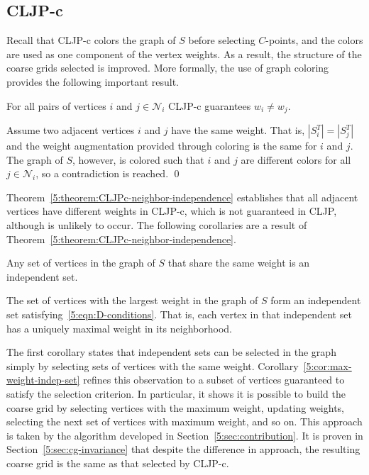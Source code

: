 \documentclass{elsart}
\newenvironment{proof}{\begin{pf}}{\qed\end{pf}}
\begin{document}
\subsection{CLJP-c}
Recall that CLJP-c colors the graph of $S$ before selecting
$C$-points, and the colors are used as one component of the vertex
weights. As a result, the structure of the coarse grids selected is
improved. More formally, the use of graph coloring provides the
following important result.
\begin{thm}
\label{5:theorem:CLJPc-neighbor-independence}
For all pairs of vertices $i$ and $j \in \mathcal{N}_i$ CLJP-c
guarantees $w_i \ne w_j$.
\end{thm}
\begin{proof}
Assume two adjacent vertices $i$ and $j$ have the same weight. That is,
$|S_i^T| = |S_j^T|$ and the weight augmentation provided through
coloring is the same for $i$ and $j$. The graph of $S$, however, is
colored such that $i$ and $j$ are different colors for all $j \in
\mathcal{N}_i$, so a contradiction is reached.
\end{proof}
Theorem~\ref{5:theorem:CLJPc-neighbor-independence} establishes that
all adjacent vertices have different weights in CLJP-c, which is not
guaranteed in CLJP, although is unlikely to occur. The following
corollaries are a result of
Theorem~\ref{5:theorem:CLJPc-neighbor-independence}.
\begin{cor}
Any set of vertices in the graph of $S$ that share the same weight is
an independent set.
\end{cor}
\begin{cor}
\label{5:cor:max-weight-indep-set}
The set of vertices with the largest weight in the graph of $S$ form
an independent set satisfying~\ref{5:eqn:D-conditions}. That is, each
vertex in that independent set has a uniquely maximal weight in its
neighborhood.
\end{cor}
The first corollary states that independent sets can be selected in
the graph simply by selecting sets of vertices with the same
weight. Corollary~\ref{5:cor:max-weight-indep-set} refines this
observation to a subset of vertices guaranteed to satisfy the
selection criterion. In particular, it shows it is possible to build
the coarse grid by selecting vertices with the maximum weight,
updating weights, selecting the next set of vertices with maximum
weight, and so on. This approach is taken by the algorithm developed
in Section~\ref{5:sec:contribution}. It is proven in
Section~\ref{5:sec:cg-invariance} that despite the difference in
approach, the resulting coarse grid is the same as that selected by
CLJP-c.
\end{document}
